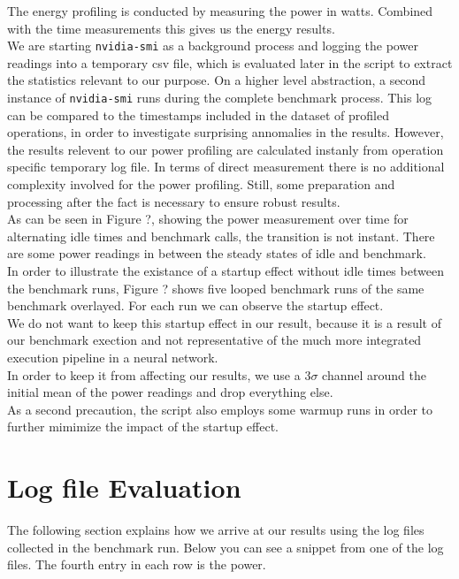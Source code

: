 The energy profiling is conducted by measuring the power in watts. Combined with the time measurements this gives us the energy results. \\
We are starting \texttt{nvidia-smi} as a background process and logging the power readings into a temporary csv file, which is evaluated later in the script to extract the statistics relevant to our purpose. On a higher level abstraction, a second instance of \texttt{nvidia-smi} runs during the complete benchmark process. This log can be compared to the timestamps included in the dataset of profiled operations, in order to investigate surprising annomalies in the results. However, the results relevent to our power profiling are calculated instanly from operation specific temporary log file. In terms of direct measurement there is no additional complexity involved for the power profiling. Still, some preparation and processing after the fact is necessary to ensure robust results. \\
As can be seen in Figure ?, showing the power measurement over time for alternating idle times and benchmark calls, the transition is not instant. There are some power readings in between the steady states of idle and benchmark. \\
In order to illustrate the existance of a startup effect without idle times between the benchmark runs, Figure ? shows five looped benchmark runs of the same benchmark overlayed. For each run we can observe the startup effect. \\
We do not want to keep this startup effect in our result, because it is a result of our benchmark exection and not representative of the much more integrated execution pipeline in a neural network.\\
In order to keep it from affecting our results, we use a $3\sigma$ channel around the initial mean of the power readings and drop everything else. \\
As a second precaution, the script also employs some warmup runs in order to further mimimize the impact of the startup effect.\\


\section{Log file Evaluation}


The following section explains how we arrive at our results using the log files collected in the benchmark run. Below you can see a snippet from one of the log files. The fourth entry in each row is the power.

